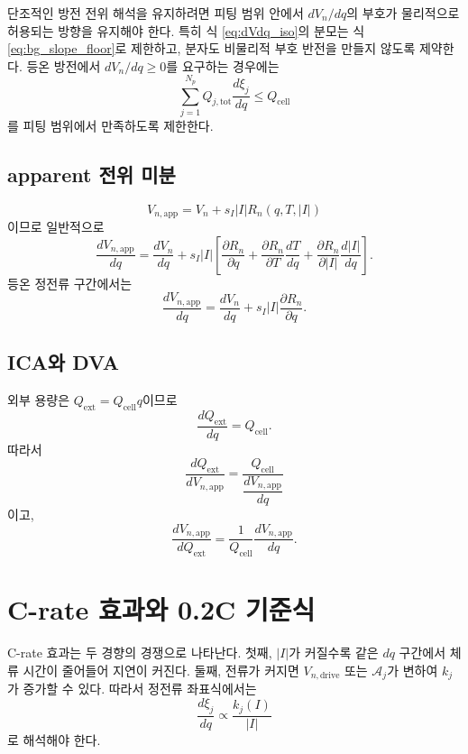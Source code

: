 \documentclass[11pt,a4paper]{article}
\newcommand{\app}{\mathrm{app}}
\newcommand{\drive}{\mathrm{drive}}
\newcommand{\cell}{\mathrm{cell}}
\newcommand{\ext}{\mathrm{ext}}
\newcommand{\tot}{\mathrm{tot}}
\begin{document}
단조적인 방전 전위 해석을 유지하려면 피팅 범위 안에서 \(dV_n/dq\)의 부호가 물리적으로 허용되는 방향을 유지해야 한다. 특히 식 \eqref{eq:dVdq_iso}의 분모는 식 \eqref{eq:bg_slope_floor}로 제한하고, 분자도 비물리적 부호 반전을 만들지 않도록 제약한다. 등온 방전에서 \(dV_n/dq\ge0\)를 요구하는 경우에는
\begin{equation}
\boxed{
\sum_{j=1}^{N_p}Q_{j,\tot}\frac{d\xi_j}{dq}\le Q_{\cell}
}
\label{eq:monotonic_constraint}
\end{equation}
를 피팅 범위에서 만족하도록 제한한다.

\subsection{apparent 전위 미분}
\begin{equation}
V_{n,\app}=V_n+s_I|I|R_n(q,T,|I|)
\end{equation}
이므로 일반적으로
\begin{equation}
\frac{dV_{n,\app}}{dq}=\frac{dV_n}{dq}+s_I|I|\left[\frac{\partial R_n}{\partial q}+\frac{\partial R_n}{\partial T}\frac{dT}{dq}+\frac{\partial R_n}{\partial |I|}\frac{d|I|}{dq}\right].
\label{eq:dVappdq_general}
\end{equation}
등온 정전류 구간에서는
\begin{equation}
\frac{dV_{n,\app}}{dq}=\frac{dV_n}{dq}+s_I|I|\frac{\partial R_n}{\partial q}.
\label{eq:dVappdq_iso}
\end{equation}

\subsection{ICA와 DVA}
외부 용량은 \(Q_{\ext}=Q_{\cell}q\)이므로
\begin{equation}
\frac{dQ_{\ext}}{dq}=Q_{\cell}.
\end{equation}
따라서
\begin{equation}
\boxed{
\frac{dQ_{\ext}}{dV_{n,\app}}=\frac{Q_{\cell}}{\dfrac{dV_{n,\app}}{dq}}
}
\label{eq:ica_final}
\end{equation}
이고,
\begin{equation}
\boxed{
\frac{dV_{n,\app}}{dQ_{\ext}}=\frac{1}{Q_{\cell}}\frac{dV_{n,\app}}{dq}.
}
\label{eq:dva_final}
\end{equation}

\section{C-rate 효과와 0.2C 기준식}
C-rate 효과는 두 경향의 경쟁으로 나타난다. 첫째, \(|I|\)가 커질수록 같은 \(dq\) 구간에서 체류 시간이 줄어들어 지연이 커진다. 둘째, 전류가 커지면 \(V_{n,\drive}\) 또는 \(\mathcal A_j\)가 변하여 \(k_j\)가 증가할 수 있다. 따라서 정전류 좌표식에서는
\begin{equation}
\frac{d\xi_j}{dq}\propto \frac{k_j(I)}{|I|}
\end{equation}
로 해석해야 한다.
\end{document}
